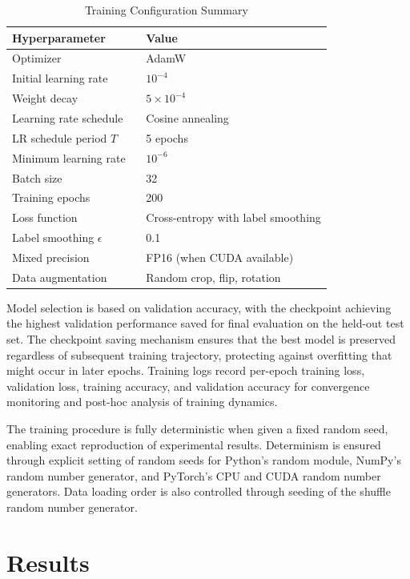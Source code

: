 \documentclass[11pt,a4paper]{article}
\begin{document}
\begin{table}[htbp]
\centering
\caption{Training Configuration Summary}
\label{tab:training_config}
\begin{tabular}{ll}
\toprule
\textbf{Hyperparameter} \ &  \textbf{Value} \\
\midrule
Optimizer \ &  AdamW \\
Initial learning rate \ &  $10^{-4}$ \\
Weight decay \ &  $5 \times 10^{-4}$ \\
Learning rate schedule \ &  Cosine annealing \\
LR schedule period $T$ \ &  5 epochs \\
Minimum learning rate \ &  $10^{-6}$ \\
Batch size \ &  32 \\
Training epochs \ &  200 \\
Loss function \ &  Cross-entropy with label smoothing \\
Label smoothing $\epsilon$ \ &  0.1 \\
Mixed precision \ &  FP16 (when CUDA available) \\
Data augmentation \ &  Random crop, flip, rotation \\
\bottomrule
\end{tabular}
\end{table}

Model selection is based on validation accuracy, with the checkpoint achieving the highest validation performance saved for final evaluation on the held-out test set. The checkpoint saving mechanism ensures that the best model is preserved regardless of subsequent training trajectory, protecting against overfitting that might occur in later epochs. Training logs record per-epoch training loss, validation loss, training accuracy, and validation accuracy for convergence monitoring and post-hoc analysis of training dynamics.

The training procedure is fully deterministic when given a fixed random seed, enabling exact reproduction of experimental results. Determinism is ensured through explicit setting of random seeds for Python's random module, NumPy's random number generator, and PyTorch's CPU and CUDA random number generators. Data loading order is also controlled through seeding of the shuffle random number generator.

\section{Results}\label{sec:results}
\end{document}
